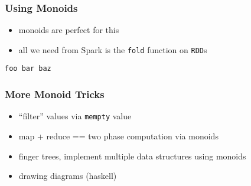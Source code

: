 \documentclass{beamer}
\begin{document}
\begin{frame}[fragile]
  \frametitle{Using Monoids}
  \begin{itemize}
  \item monoids are perfect for this
  \item all we need from Spark is the \texttt{fold} function on \texttt{RDD}s
  \end{itemize}
\begin{verbatim}
foo bar baz
\end{verbatim}
\end{frame}


\begin{frame}
  \frametitle{More Monoid Tricks}
  \begin{itemize}
  \item ``filter'' values via \texttt{mempty} value
  \item map + reduce == two phase computation via monoids
  \item finger trees, implement multiple data structures using monoids
  \item drawing diagrams (haskell)
  \end{itemize}
\end{frame}
\end{document}
